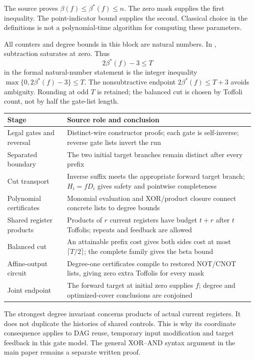 The source proves $\beta(f)\le\beta^*(f)\le n$. The zero mask supplies the
first inequality. The point-indicator bound supplies the second. Classical
choice in the definitions is not a polynomial-time algorithm for computing
these parameters.

All counters and degree bounds in this block are natural numbers. In
, subtraction saturates at zero. Thus
\[
 2\beta^*(f)-3\le T
\]
in the formal natural-number statement is the integer inequality
$\max\{0,2\beta^*(f)-3\}\le T$. The nonsubtractive endpoint
$2\beta^*(f)\le T+3$ avoids ambiguity. Rounding at odd $T$ is retained;
the balanced cut is chosen by Toffoli count, not by half the gate-list length.

\begin{tabularx}{\textwidth}{@{}>{\raggedright\arraybackslash}p{1.8in}>{\raggedright\arraybackslash}X@{}}\toprule
Stage & Source role and conclusion\\\midrule
Legal gates and reversal & Distinct-wire constructor proofs; each gate is self-inverse; reverse gate lists invert the run\\
Separated boundary & The two initial target branches remain distinct after every prefix\\
Cut transport & Inverse suffix meets the appropriate forward target branch; $H_i=fD_i$ gives safety and pointwise completeness\\
Polynomial certificates & Monomial evaluation and XOR/product closure connect concrete lists to degree bounds\\
Shared register products & Products of $r$ current registers have budget $t+r$ after $t$ Toffolis; repeats and feedback are allowed\\
Balanced cut & An attainable prefix cost gives both sides cost at most $\lceil T/2\rceil$; the complete family gives the beta bound\\
Affine-output circuit & Degree-one certificates compile to restored NOT/CNOT lists, giving zero extra Toffolis for every mask\\
Joint endpoint & The forward target at initial zero supplies $f$; degree and optimized-cover conclusions are conjoined\\\bottomrule
\end{tabularx}

The strongest degree invariant concerns products of actual current registers.
It does not duplicate the histories of shared controls. This is why its
coordinate consequence applies to DAG reuse, temporary input modification and
target feedback in this gate model. The general XOR--AND syntax argument in
the main paper remains a separate written proof.

